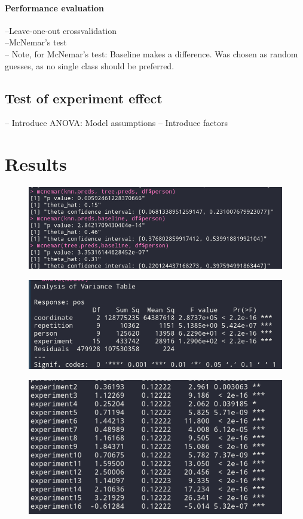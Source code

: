 \documentclass[12pt,fleqn]{article}
\begin{document}
\paragraph{Performance evaluation}
--Leave-one-out crossvalidation\\
--McNemar's test\\
-- Note, for McNemar's test: Baseline makes a difference. Was chosen as random guesses, as no single class should be preferred.
\subsection{Test of experiment effect}

-- Introduce ANOVA: Model assumptions
-- Introduce factors



\section{Results}
\begin{figure}[H]
	\centering
	\includegraphics[width=.7\linewidth]{mcnemar_results}
\end{figure}
\begin{figure}[H]
\centering
\includegraphics[width=.7\linewidth]{p1_anova}
\end{figure}
\begin{figure}[H]
	\centering
	\includegraphics[width=.7\linewidth]{p1_anova_summay}
\end{figure}
\end{document}
